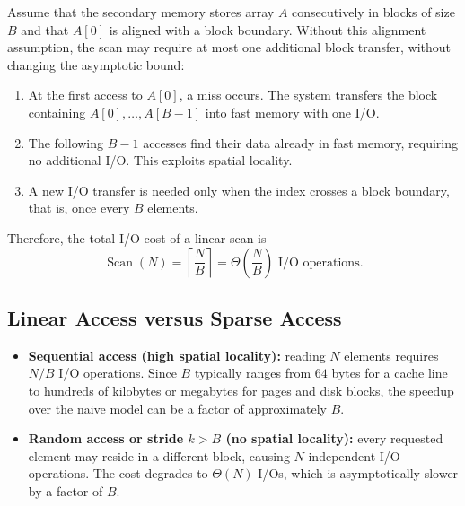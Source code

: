 Assume that the secondary memory stores array $A$ consecutively in blocks of
size $B$ and that $A[0]$ is aligned with a block boundary. Without this
alignment assumption, the scan may require at most one additional block
transfer, without changing the asymptotic bound:

\begin{enumerate}
  \item At the first access to $A[0]$, a miss occurs. The system transfers
    the block containing $A[0], \ldots, A[B-1]$ into fast memory with one I/O.
  \item The following $B-1$ accesses find their data already in fast memory,
    requiring no additional I/O. This exploits spatial locality.
  \item A new I/O transfer is needed only when the index crosses a block
    boundary, that is, once every $B$ elements.
\end{enumerate}

Therefore, the total I/O cost of a linear scan is
\[
  \operatorname{Scan}(N) = \left\lceil \frac{N}{B} \right\rceil
  = \Theta\!\left(\frac{N}{B}\right)\text{ I/O operations}.
\]

\subsection{Linear Access versus Sparse Access}

\begin{itemize}
  \item \textbf{Sequential access (high spatial locality):} reading $N$
    elements requires $N/B$ I/O operations. Since $B$ typically ranges from
    $64$ bytes for a cache line to hundreds of kilobytes or megabytes for
    pages and disk blocks, the speedup over the naive model can be a factor of
    approximately $B$.
  \item \textbf{Random access or stride $k>B$ (no spatial locality):} every
    requested element may reside in a different block, causing $N$ independent
    I/O operations. The cost degrades to $\Theta(N)$ I/Os, which is
    asymptotically slower by a factor of $B$.
\end{itemize}
